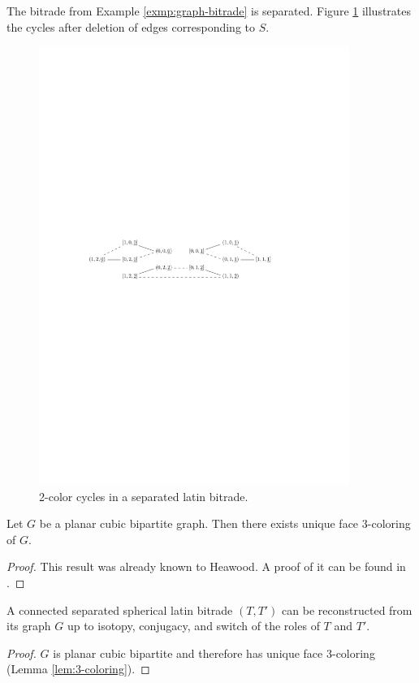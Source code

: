 \begin{exmp}
The bitrade from Example \ref{exmp:graph-bitrade} is separated. Figure \ref{fig:separated-graph} illustrates the cycles after deletion of edges corresponding to $S$.

\begin{figure}[htb]
\centering
\includegraphics[width=0.9\textwidth]{img/separated.pdf}
\caption{2-color cycles in a separated latin bitrade.}
\label{fig:separated-graph}
\end{figure}
\end{exmp}%

\begin{lem}
\label{lem:3-coloring}
Let $G$ be a planar cubic bipartite graph. Then there exists unique face 3-coloring of $G$.
\end{lem}
\begin{proof}
This result was already known to Heawood. A proof of it can be found in \cite{Tutte48}.
\end{proof}

\begin{thm}
A connected separated spherical latin bitrade $(T,T')$ can be reconstructed from its graph $G$ up to isotopy, conjugacy, and switch of the roles of $T$ and $T'$.
\end{thm}%
\begin{proof}
$G$ is planar cubic bipartite and therefore has unique face 3-coloring (Lemma \ref{lem:3-coloring}).
\end{proof}





